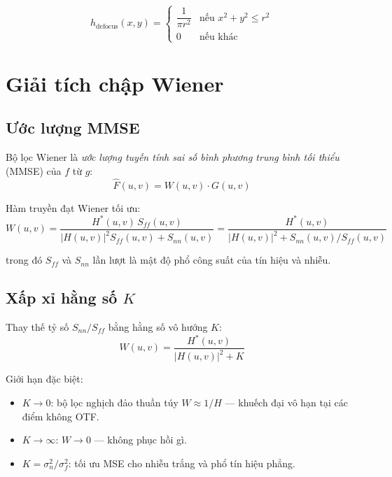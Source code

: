 \documentclass[12pt, a4paper]{article}
\begin{document}
\begin{equation}
  h_{\mathrm{defocus}}(x,y) =
  \begin{cases}
    \dfrac{1}{\pi r^2} & \text{nếu } x^2 + y^2 \le r^2 \\[6pt]
    0                  & \text{nếu khác}
  \end{cases}
  \label{eq:psf_defocus}
\end{equation}

\section{Giải tích chập Wiener}

\subsection{Ước lượng MMSE}

Bộ lọc Wiener là \emph{ước lượng tuyến tính sai số bình phương trung
bình tối thiểu} (MMSE) của $f$ từ $g$:
\begin{equation}
  \hat{F}(u,v) = W(u,v) \cdot G(u,v)
  \label{eq:wiener_out}
\end{equation}

Hàm truyền đạt Wiener tối ưu:
\begin{equation}
  W(u,v)
  = \frac{H^*(u,v)\, S_{ff}(u,v)}
         {\lvert H(u,v)\rvert^2 S_{ff}(u,v) + S_{nn}(u,v)}
  = \frac{H^*(u,v)}
         {\lvert H(u,v)\rvert^2 + S_{nn}(u,v)/S_{ff}(u,v)}
  \label{eq:wiener_full}
\end{equation}

trong đó $S_{ff}$ và $S_{nn}$ lần lượt là mật độ phổ công suất của
tín hiệu và nhiễu.

\subsection{Xấp xỉ hằng số $K$}

Thay thế tỷ số $S_{nn}/S_{ff}$ bằng hằng số vô hướng $K$:
\begin{equation}
  W(u,v) = \frac{H^*(u,v)}{\lvert H(u,v)\rvert^2 + K}
  \label{eq:wiener_K}
\end{equation}

Giới hạn đặc biệt:
\begin{itemize}
  \item $K \to 0$: bộ lọc nghịch đảo thuần túy
        $W \approx 1/H$ --- khuếch đại vô hạn tại các điểm không OTF.
  \item $K \to \infty$: $W \to 0$ --- không phục hồi gì.
  \item $K = \sigma_n^2 / \sigma_f^2$: tối ưu MSE cho nhiễu trắng
        và phổ tín hiệu phẳng.
\end{itemize}
\end{document}
